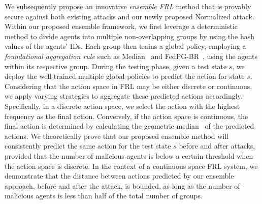 We subsequently propose an innovative \emph{ensemble FRL} method that is provably secure against both existing attacks and our newly proposed Normalized attack. Within our proposed ensemble framework, we first leverage a deterministic method to divide agents into multiple non-overlapping groups by using the hash values of the agents' IDs. Each group then trains a global policy, employing a \emph{foundational aggregation rule} such as Median~\cite{yin2018byzantine} and FedPG-BR~\cite{fan2021fault}, using the agents within its respective group. 
During the testing phase, given a test state $s$, we deploy the well-trained multiple global policies to predict the action for state $s$. 
Considering that the action space in FRL may be either discrete or continuous, we apply varying strategies to aggregate these predicted actions accordingly. 
Specifically, in a discrete action space, we select the action with the highest frequency as the final action. 
Conversely, if the action space is continuous, the final action is determined by calculating the geometric median~\cite{ChenPOMACS17} of the predicted actions.
%
We theoretically prove that our proposed ensemble method will consistently predict the same action for the test state $s$ before and after attacks, provided that the number of malicious agents is below a certain threshold when the action space is discrete. In the context of a continuous space FRL system, we demonstrate that the distance between actions predicted by our ensemble approach, before and after the attack, is bounded, as long as the number of malicious agents is less than half of the total number of groups.
%




